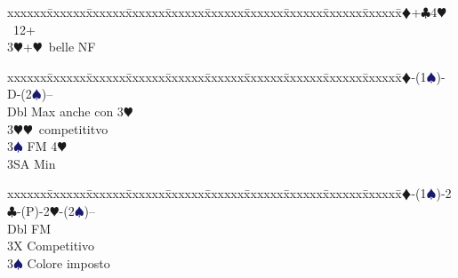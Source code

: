\documentclass[a4paper,italian]{article}
\newcommand{\BC}{\textcolor{OliveGreen}{$\clubsuit$}}
\newcommand{\BD}{\textcolor{RedOrange}{$\vardiamondsuit$}}
\newcommand{\BH}{\textcolor{Red2}{$\varheartsuit${}}}
\newcommand{\BS}{\textcolor{MidnightBlue}{$\spadesuit${}}}
\newenvironment{bidtable}
{\begin{tabbing}

    xxxxxx\=xxxxxx\=xxxxxx\=xxxxxx\=xxxxxx\=xxxxxx\=xxxxxx\=xxxxxx\=xxxxxx\=xxxxxx\=\kill}
{\end{tabbing} }%
\newenvironment{sviluppi}
{\begin{tcolorbox}[colframe=azzurro,title=Sviluppi particolari]}
    {
\end{tcolorbox} }%
\begin{document}
\begin{multicols*}{2}
\begin{bidtable}
                                            3\BD {}+\BC 4\BH\ 12+\\
                                            3\BH {}+\BH\ belle NF\-
                                        \end{bidtable}
                                        \begin{sviluppi}
                                            \begin{bidtable}
                                                1\BD-(1\BS)-D-(2\BS)--\+\\
                                                Dbl \> Max anche con 3\BH \\
                                                3\BH {}\BH\ competititvo\\
                                                3\BS \> FM 4\BH \+\\
                                                3SA \> Min\-\-
                                            \end{bidtable}
                                            \bigbreak
                                            \begin{bidtable}
                                                1\BD-(1\BS)-2\BC-(P)-2\BH-(2\BS)--\+\\
                                                Dbl \> FM\\
                                                3X \> Competitivo\\
                                                3\BS \> Colore imposto\-
                                            \end{bidtable}
                                        \end{sviluppi}
                                    \end{multicols*}
\end{document}
